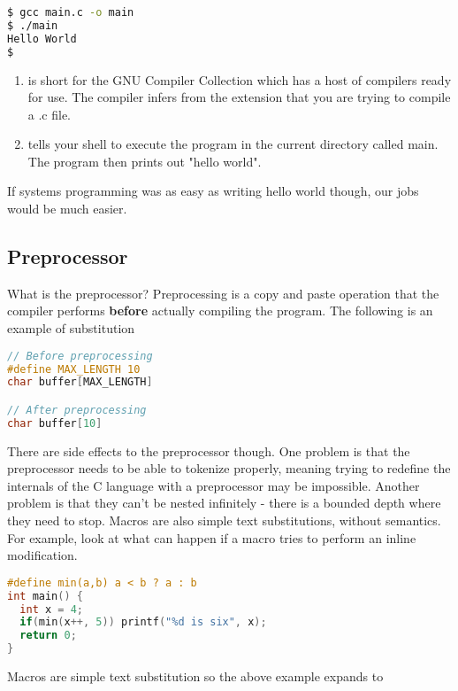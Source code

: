 \begin{lstlisting}[language=bash]
$ gcc main.c -o main
$ ./main
Hello World
$
\end{lstlisting}

\begin{enumerate}
\item {} is short for the \gls{GNU Compiler Collection} which has a host of compilers ready for use.
  The compiler infers from the extension that you are trying to compile a .c file.
\item {} tells your shell to execute the program in the current directory called main.
  The program then prints out "hello world".
\end{enumerate}

If systems programming was as easy as writing hello world though, our jobs would be much easier.

\subsection{Preprocessor}

What is the \gls{preprocessor}?
Preprocessing is a copy and paste operation that the compiler performs \textbf{before} actually compiling the program.
The following is an example of substitution

\begin{lstlisting}[language=C]
// Before preprocessing
#define MAX_LENGTH 10
char buffer[MAX_LENGTH]

// After preprocessing
char buffer[10]
\end{lstlisting}

There are side effects to the preprocessor though.
One problem is that the preprocessor needs to be able to \gls{tokenize} properly, meaning trying to redefine the internals of the C language with a preprocessor may be impossible.
Another problem is that they can't be \gls{nested} infinitely - there is a bounded depth where they need to stop.
Macros are also simple text substitutions, without semantics.
For example, look at what can happen if a macro tries to perform an inline modification.

\begin{lstlisting}[language=C]
#define min(a,b) a < b ? a : b
int main() {
  int x = 4;
  if(min(x++, 5)) printf("%d is six", x);
  return 0;
}
\end{lstlisting}

Macros are simple text substitution so the above example expands to


